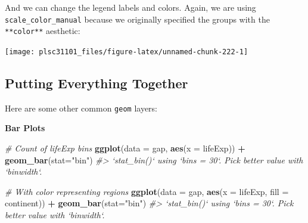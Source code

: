 \documentclass[
]{book}
\newenvironment{Shaded}{\begin{snugshade}}{\end{snugshade}}
\newcommand{\CommentTok}[1]{\textcolor[rgb]{0.56,0.35,0.01}{\textit{#1}}}
\newcommand{\DataTypeTok}[1]{\textcolor[rgb]{0.13,0.29,0.53}{#1}}
\newcommand{\KeywordTok}[1]{\textcolor[rgb]{0.13,0.29,0.53}{\textbf{#1}}}
\newcommand{\NormalTok}[1]{#1}
\newcommand{\OperatorTok}[1]{\textcolor[rgb]{0.81,0.36,0.00}{\textbf{#1}}}
\newcommand{\StringTok}[1]{\textcolor[rgb]{0.31,0.60,0.02}{#1}}
\begin{document}
And we can change the legend labels and colors. Again, we are using \texttt{scale\_color\_manual} because we originally specified the groups with the \texttt{**color**} aesthetic:

\begin{Shaded}
\end{Shaded}

\begin{center}\texttt{[image: plsc31101\_files/figure-latex/unnamed-chunk-222-1]} \end{center}

\hypertarget{putting-everything-together}{%
\subsection{Putting Everything Together}\label{putting-everything-together}}

Here are some other common \texttt{geom} layers:

\textbf{Bar Plots}

\begin{Shaded}
\begin{Highlighting}[]
\CommentTok{# Count of lifeExp bins}
\KeywordTok{ggplot}\NormalTok{(}\DataTypeTok{data =}\NormalTok{ gap, }\KeywordTok{aes}\NormalTok{(}\DataTypeTok{x =}\NormalTok{ lifeExp)) }\OperatorTok{+}\StringTok{ }
\StringTok{  }\KeywordTok{geom_bar}\NormalTok{(}\DataTypeTok{stat=}\StringTok{"bin"}\NormalTok{)}
\CommentTok{#> `stat_bin()` using `bins = 30`. Pick better value with `binwidth`.}

\CommentTok{# With color representing regions}
\KeywordTok{ggplot}\NormalTok{(}\DataTypeTok{data =}\NormalTok{ gap, }\KeywordTok{aes}\NormalTok{(}\DataTypeTok{x =}\NormalTok{ lifeExp, }\DataTypeTok{fill =}\NormalTok{ continent)) }\OperatorTok{+}\StringTok{ }
\StringTok{  }\KeywordTok{geom_bar}\NormalTok{(}\DataTypeTok{stat=}\StringTok{"bin"}\NormalTok{)}
\CommentTok{#> `stat_bin()` using `bins = 30`. Pick better value with `binwidth`.}
\end{Highlighting}
\end{Shaded}
\end{document}
